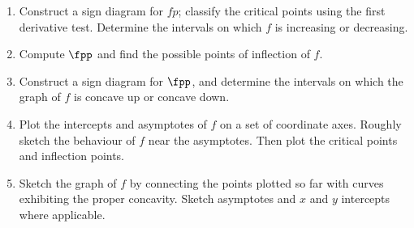 {%
\begin{enumerate}\addtocounter{enumi}{5}
\item 		Construct a sign diagram for $fp$; classify the critical points using the first derivative test. Determine the intervals on which $f$ is increasing or decreasing.
\item		Compute $\fpp$ and find the possible points of inflection of $f$. 
\item		Construct a sign diagram for $\fpp$, and determine the intervals on which the graph of $f$ is concave up or concave down.
\item 		Plot the intercepts and asymptotes of $f$ on a set of coordinate axes. Roughly sketch the behaviour of $f$ near the asymptotes.
Then plot the critical points and inflection points.
\item		Sketch the graph of $f$ by connecting the points plotted so far with curves exhibiting the proper concavity. Sketch asymptotes and $x$ and $y$ intercepts where applicable.
\end{enumerate}
}

